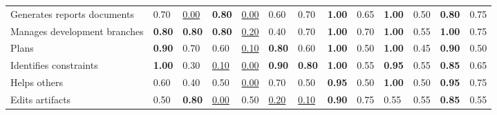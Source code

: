 \begin{tabular}{lllllllllllll}
Generates reports documents & 0.70 & \underline{0.00} & \textbf{0.80} & \underline{0.00} & 0.60 & 0.70 & \textbf{1.00} & 0.65 & \textbf{1.00} & 0.50 & \textbf{0.80} & 0.75 \\
Manages development branches & \textbf{0.80} & \textbf{0.80} & \textbf{0.80} & \underline{0.20} & 0.40 & 0.70 & \textbf{1.00} & 0.70 & \textbf{1.00} & 0.55 & \textbf{1.00} & 0.75 \\
Plans & \textbf{0.90} & 0.70 & 0.60 & \underline{0.10} & \textbf{0.80} & 0.60 & \textbf{1.00} & 0.50 & \textbf{1.00} & 0.45 & \textbf{0.90} & 0.50 \\
Identifies constraints & \textbf{1.00} & 0.30 & \underline{0.10} & \underline{0.00} & \textbf{0.90} & \textbf{0.80} & \textbf{1.00} & 0.55 & \textbf{0.95} & 0.55 & \textbf{0.85} & 0.65 \\
Helps others & 0.60 & 0.40 & 0.50 & \underline{0.00} & 0.70 & 0.50 & \textbf{0.95} & 0.50 & \textbf{1.00} & 0.50 & \textbf{0.95} & 0.75 \\
Edits artifacts & 0.50 & \textbf{0.80} & \underline{0.00} & 0.50 & \underline{0.20} & \underline{0.10} & \textbf{0.90} & 0.75 & 0.55 & 0.55 & \textbf{0.85} & 0.55 \\
\bottomrule
\end{tabular}
